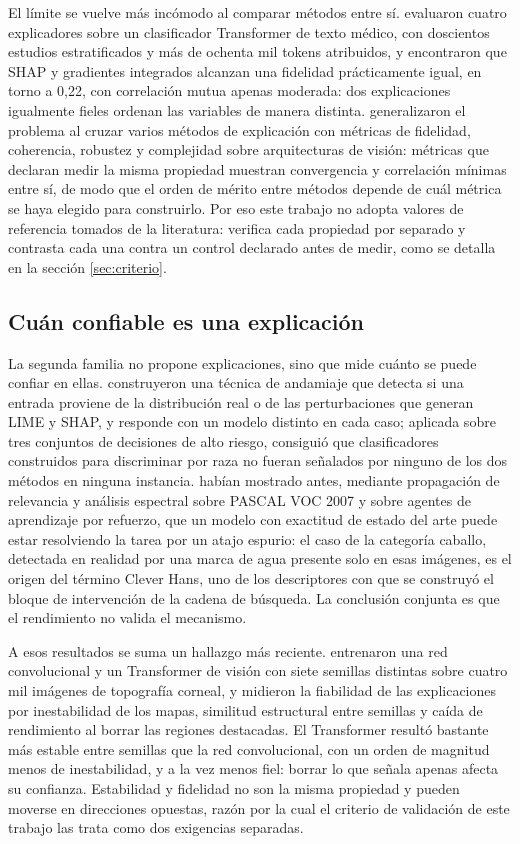 El límite se vuelve más incómodo al comparar métodos entre sí. \textcite{medtext2026attribution} evaluaron cuatro explicadores sobre un clasificador Transformer de texto médico, con doscientos estudios estratificados y más de ochenta mil tokens atribuidos, y encontraron que SHAP y gradientes integrados alcanzan una fidelidad prácticamente igual, en torno a 0,22, con correlación mutua apenas moderada: dos explicaciones igualmente fieles ordenan las variables de manera distinta. \textcite{vitexplain2024evaluation} generalizaron el problema al cruzar varios métodos de explicación con métricas de fidelidad, coherencia, robustez y complejidad sobre arquitecturas de visión: métricas que declaran medir la misma propiedad muestran convergencia y correlación mínimas entre sí, de modo que el orden de mérito entre métodos depende de cuál métrica se haya elegido para construirlo. Por eso este trabajo no adopta valores de referencia tomados de la literatura: verifica cada propiedad por separado y contrasta cada una contra un control declarado antes de medir, como se detalla en la sección \ref{sec:criterio}.

\subsection{Cuán confiable es una explicación}

La segunda familia no propone explicaciones, sino que mide cuánto se puede confiar en ellas. \textcite{slack2020fooling} construyeron una técnica de andamiaje que detecta si una entrada proviene de la distribución real o de las perturbaciones que generan LIME y SHAP, y responde con un modelo distinto en cada caso; aplicada sobre tres conjuntos de decisiones de alto riesgo, consiguió que clasificadores construidos para discriminar por raza no fueran señalados por ninguno de los dos métodos en ninguna instancia. \textcite{lapuschkin2019unmasking} habían mostrado antes, mediante propagación de relevancia y análisis espectral sobre PASCAL VOC 2007 y sobre agentes de aprendizaje por refuerzo, que un modelo con exactitud de estado del arte puede estar resolviendo la tarea por un atajo espurio: el caso de la categoría caballo, detectada en realidad por una marca de agua presente solo en esas imágenes, es el origen del término Clever Hans, uno de los descriptores con que se construyó el bloque de intervención de la cadena de búsqueda. La conclusión conjunta es que el rendimiento no valida el mecanismo.

A esos resultados se suma un hallazgo más reciente. \textcite{keratoconus2026instability} entrenaron una red convolucional y un Transformer de visión con siete semillas distintas sobre cuatro mil imágenes de topografía corneal, y midieron la fiabilidad de las explicaciones por inestabilidad de los mapas, similitud estructural entre semillas y caída de rendimiento al borrar las regiones destacadas. El Transformer resultó bastante más estable entre semillas que la red convolucional, con un orden de magnitud menos de inestabilidad, y a la vez menos fiel: borrar lo que señala apenas afecta su confianza. Estabilidad y fidelidad no son la misma propiedad y pueden moverse en direcciones opuestas, razón por la cual el criterio de validación de este trabajo las trata como dos exigencias separadas.

